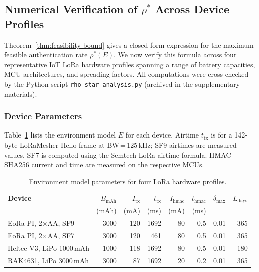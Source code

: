 
\subsection{Numerical Verification of $\rho^*$ Across Device Profiles}
\label{subsec:rho-star-verification}

Theorem~\ref{thm:feasibility-bound} gives a closed-form expression for the
maximum feasible authentication rate $\rho^*(E)$.  We now verify this
formula across four representative IoT LoRa hardware profiles spanning a
range of battery capacities, MCU architectures, and spreading factors.  All
computations were cross-checked by the Python script
\texttt{rho\_star\_analysis.py} (archived in the supplementary materials).

\subsubsection{Device Parameters}
\label{subsubsec:device-params}

Table~\ref{tab:device-params} lists the environment model $E$ for each
device.  Airtime $t_{\mathrm{tx}}$ is for a 142-byte LoRaMesher Hello
frame at BW\,=\,125\,kHz; SF9 airtimes are measured values, SF7 is
computed using the Semtech LoRa airtime formula.  HMAC-SHA256 current and
time are measured on the respective MCUs.

\begin{table}[ht]
\centering
\caption{Environment model parameters for four LoRa hardware profiles.}
\label{tab:device-params}
\small
\begin{tabular}{@{}lrrrrrrr@{}}
\toprule
\textbf{Device} &
  $B_{\mathrm{mAh}}$ &
  $I_{\mathrm{tx}}$ &
  $t_{\mathrm{tx}}$ &
  $I_{\mathrm{hmac}}$ &
  $t_{\mathrm{hmac}}$ &
  $\delta_{\max}$ &
  $L_{\mathrm{days}}$ \\
  & (mAh) & (mA) & (ms) & (mA) & (ms) & & \\
\midrule
EoRa PI, 2$\times$AA, SF9    & 3000 & 120 & 1692 & 80 & 0.5 & 0.01 & 365 \\
EoRa PI, 2$\times$AA, SF7    & 3000 & 120 &  461 & 80 & 0.5 & 0.01 & 365 \\
Heltec V3, LiPo 1000\,mAh   & 1000 & 118 & 1692 & 80 & 0.5 & 0.01 & 180 \\
RAK4631, LiPo 3000\,mAh     & 3000 &  87 & 1692 & 20 & 0.2 & 0.01 & 365 \\
\bottomrule
\end{tabular}
\end{table}

